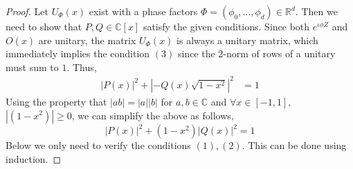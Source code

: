 \documentclass[12pt, oneside]{book}
\theoremstyle{definition}
\theoremstyle{definition}
\theoremstyle{remark}
\begin{document}
\begin{proof}
    Let $U_{\Phi}(x)$ exist with a phase factors $\Phi=(\phi_0,\ldots,\phi_d)\in\mathbb{R}^d$. Then we need to show that $P,Q\in\mathbb{C}[x]$ satisfy the given conditions. Since both $e^{\iota \phi Z}$ and $O(x)$ are unitary, the matrix $U_{\Phi}(x)$ is always a unitary matrix, which immediately implies the condition $(3)$ since the 2-norm of rows of a unitary must sum to $1$. Thus,
    \begin{align*}
    |P(x)|^2 + |-Q(x)\sqrt{1-x^2}|^2&=1
    \end{align*}
    Using the property that $|ab|=|a||b|$ for $a,b\in\mathbb{C}$ and $\forall x\in[-1,1]$, $|(1-x^2)|\geq 0$, we can simplify the above as follows,
    \[
    |P(x)|^2+(1-x^2)|Q(x)|^2=1
    \]
    Below we only need to verify the conditions $(1),(2)$. This can be done using induction.


\end{proof}
\end{document}
